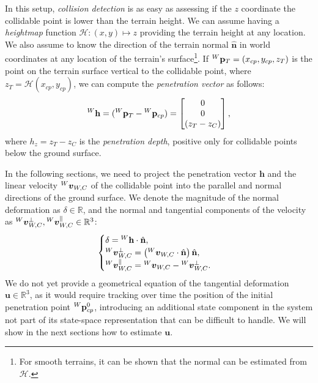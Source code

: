 In this setup, \emph{collision detection} is as easy as assessing if the $z$ coordinate the collidable point is lower than the terrain height.
We can assume having a \emph{heightmap} function $\mathcal{H}: (x, y) \mapsto z$ providing the terrain height at any location.
We also assume to know the direction of the terrain normal $\hat{\mathbf{n}}$ in world coordinates at any location of the terrain's surface\footnote{For smooth terrains, it can be shown that the normal can be estimated from $\mathcal{H}$.}.
If $\pos[W]_T = (x_{cp}, y_{cp}, z_T)$ is the point on the terrain surface vertical to the collidable point, where $z_T = \mathcal{H}(x_{cp}, y_{cp})$,
we can compute the \emph{penetration vector} as follows:
%
\begin{equation*}
    {}^W\mathbf{h} = (\pos[W]_T - \pos[W]_{cp}) = 
    \begin{bmatrix}
    0 \\ 0 \\ (z_T - z_C)
    \end{bmatrix}
    ,
\end{equation*}
%
where $h_z = z_T - z_C$ is the \emph{penetration depth}, positive only for collidable points below the ground surface.

In the following sections, we need to project the penetration vector $\mathbf{h}$ and the linear velocity $\vellin[W]_{W, C}$ of the collidable point into the parallel and normal directions of the ground surface.
We denote the magnitude of the normal deformation as $\delta \in \mathbb{R}$, and the normal and tangential components of the velocity as $\vellin[W]^{\perp}_{W, C}, \vellin[W]^{\parallel}_{W, C} \in \mathbb{R}^3$:
%
\begin{align*}
    \begin{cases}
        \delta = {}^W\mathbf{h} \cdot \hat{\mathbf{n}}, \\
        \vellin[W]^{\perp}_{W, C} = \left(\vellin[W]_{W, C} \cdot \hat{\mathbf{n}}\right) \hat{\mathbf{n}}, \\
    \vellin[W]^{\parallel}_{W, C} = \vellin[W]_{W, C} - \vellin[W]^{\perp}_{W, C}
    .
    \end{cases}
\end{align*}
%
We do not yet provide a geometrical equation of the tangential deformation $\mathbf{u} \in \mathbb{R}^3$, as it would require tracking over time the position of the initial penetration point $\pos[W]^0_{cp}$, introducing an additional state component in the system not part of its state-space representation that can be difficult to handle.
We will show in the next sections how to estimate $\mathbf{u}$.

